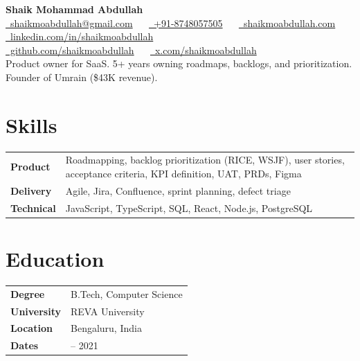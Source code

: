 \documentclass[letterpaper,10.5pt]{article}
\newcommand{\skill}[2]{\textbf{#1} & #2 \\}
\begin{document}
\begin{center}
  {\Huge\bfseries Shaik Mohammad Abdullah}\\[4pt]
  {\footnotesize
    \href{mailto:shaikmoabdullah@gmail.com}{\faEnvelope\ shaikmoabdullah@gmail.com} \ \textbar\ %
    \href{https://wa.me/918748057505}{\faWhatsapp\ +91-8748057505} \ \textbar\ %
    \href{https://shaikmoabdullah.com}{\faGlobe\ shaikmoabdullah.com} \ \textbar\ %
    \mbox{\href{https://linkedin.com/in/shaikmoabdullah}{\faLinkedin\ linkedin.com/in/shaikmoabdullah}}\\
    \mbox{\href{https://github.com/shaikmoabdullah}{\faGithub\ github.com/shaikmoabdullah}} \ \textbar\ %
    \mbox{\href{https://x.com/shaikmoabdullah}{\faTwitter\ x.com/shaikmoabdullah}}
  }\\[3pt]
  {\small Product owner for SaaS. 5+ years owning roadmaps, backlogs, and prioritization. Founder of Umrain (\$43K revenue).}
\end{center}

\noindent
\begin{minipage}[t]{0.66\textwidth}
\section{Skills}
\begin{tabularx}{\linewidth}{@{}l >{\raggedright\arraybackslash}X@{}}
  \skill{Product}{Roadmapping, backlog prioritization (RICE, WSJF), user stories, acceptance criteria, KPI definition, UAT, PRDs, Figma}
  \skill{Delivery}{Agile, Jira, Confluence, sprint planning, defect triage}
  \skill{Technical}{JavaScript, TypeScript, SQL, React, Node.js, PostgreSQL}
\end{tabularx}
\end{minipage}\hfill
\begin{minipage}[t]{0.31\textwidth}
\section{Education}
\begin{tabularx}{\linewidth}{@{}l >{\raggedright\arraybackslash}X@{}}
  \skill{Degree}{B.Tech, Computer Science}
  \skill{University}{REVA University}
  \skill{Location}{Bengaluru, India}
  \skill{Dates}{2017 -- 2021}
\end{tabularx}
\end{minipage}
\end{document}
